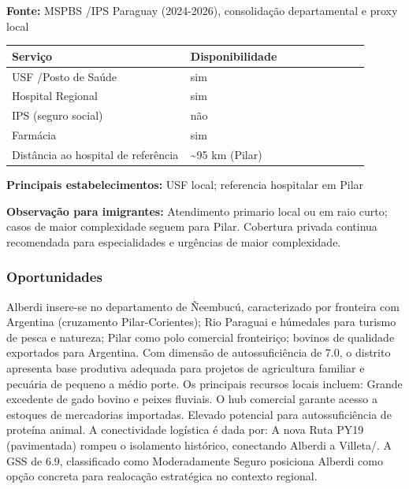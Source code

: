 \textbf{Fonte:} MSPBS /\allowbreak  IPS Paraguay (2024-2026), consolidação
departamental e proxy local

{\def\LTcaptype{none} %
\begin{longtable}{@{}>{\raggedright\arraybackslash}p{0.45\linewidth} >{\raggedright\arraybackslash}p{0.45\linewidth}@{}}
\toprule\noalign{}
Serviço & Disponibilidade \\
\midrule\noalign{}
\endhead
\bottomrule\noalign{}
\endlastfoot
USF /\allowbreak  Posto de Saúde & sim \\
Hospital Regional & sim \\
IPS (seguro social) & não \\
Farmácia & sim \\
Distância ao hospital de referência & \textasciitilde95 km (Pilar) \\
\end{longtable}
}

\textbf{Principais estabelecimentos:} USF local; referencia hospitalar
em Pilar

\textbf{Observação para imigrantes:} Atendimento primario local ou em
raio curto; casos de maior complexidade seguem para Pilar. Cobertura
privada continua recomendada para especialidades e urgências de maior
complexidade.
\newpage

\subsubsection*{Oportunidades}\label{oport-alberdi-1202}
Alberdi insere-se no departamento de Ñeembucú, caracterizado por fronteira com Argentina (cruzamento Pilar-Corientes); Rio Paraguai e húmedales para turismo de pesca e natureza; Pilar como polo comercial fronteiriço; bovinos de qualidade exportados para Argentina. Com dimensão de autossuficiência de 7.0, o distrito apresenta base produtiva adequada para projetos de agricultura familiar e pecuária de pequeno a médio porte. Os principais recursos locais incluem: Grande excedente de gado bovino e peixes fluviais. O hub comercial garante acesso a estoques de mercadorias importadas. Elevado potencial para autossuficiência de proteína animal. A conectividade logística é dada por: A nova Ruta PY19 (pavimentada) rompeu o isolamento histórico, conectando Alberdi a Villeta/. A GSS de 6.9, classificado como Moderadamente Seguro posiciona Alberdi como opção concreta para realocação estratégica no contexto regional.

